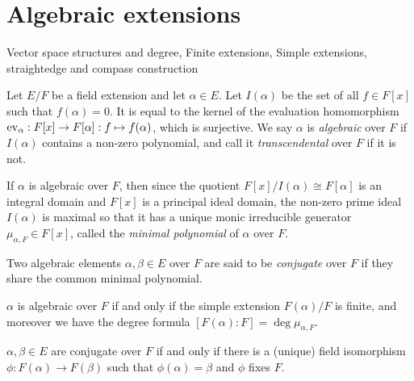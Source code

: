\documentclass{../../large}
\begin{document}
\section{Algebraic extensions}

\begin{prb}
Vector space structures and degree,
Finite extensions,
Simple extensions,
straightedge and compass construction
\end{prb}

\begin{prb}
Let $E/F$ be a field extension and let $\alpha\in E$.
Let $I(\alpha)$ be the set of all $f\in F[x]$ such that $f(\alpha)=0$.
It is equal to the kernel of the evaluation homomorphism $\operatorname{ev}_\alpha:F[x]\to F[\alpha]:f\mapsto f(\alpha)$, which is surjective.
We say $\alpha$ is \emph{algebraic} over $F$ if $I(\alpha)$ contains a non-zero polynomial, and call it \emph{transcendental} over $F$ if it is not.

If $\alpha$ is algebraic over $F$, then since the quotient $F[x]/I(\alpha)\cong F[\alpha]$ is an integral domain and $F[x]$ is a principal ideal domain, the non-zero prime ideal $I(\alpha)$ is maximal so that it has a unique monic irreducible generator $\mu_{\alpha,F}\in F[x]$, called the \emph{minimal polynomial} of $\alpha$ over $F$.

Two algebraic elements $\alpha,\beta\in E$ over $F$ are said to be \emph{conjugate} over $F$ if they share the common minimal polynomial.
\begin{parts}
\item $\alpha$ is algebraic over $F$ if and only if the simple extension $F(\alpha)/F$ is finite, and moreover we  have the degree formula $[F(\alpha):F]=\deg\mu_{\alpha,F}$.
\item $\alpha,\beta\in E$ are conjugate over $F$ if and only if there is a (unique) field isomorphism $\phi:F(\alpha)\to F(\beta)$ such that $\phi(\alpha)=\beta$ and $\phi$ fixes $F$.
\end{parts}
\end{prb}
\end{document}
